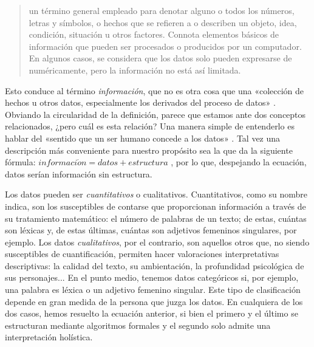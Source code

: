 \blockquote{un término general empleado para denotar alguno o todos los números, letras y símbolos, o hechos que se refieren a o describen un objeto, idea, condición, situación u otros factores. Connota elementos básicos de información que pueden ser procesados o producidos por un computador. En algunos casos, se considera que los datos solo pueden expresarse de numéricamente, pero la información no está así limitada. \parencite[\textit{s.v.} \textit{data}; traducción propia]{bureau1962}}

Esto conduce al término \textit{información}, que no es otra cosa que una «colección de hechos u otros datos, especialmente los derivados del proceso de datos» \parencite[\textit{s.v.} \textit{information}]{bureau1962}. Obviando la circularidad de la definición, parece que estamos ante dos conceptos relacionados, ¿pero cuál es esta relación? Una manera simple de entenderlo es hablar del «sentido que un ser humano concede a los datos»  \parencite[\textit{s.v.} \textit{information}; traducción propia]{government1997}. Tal vez una descripción más conveniente para nuestro propósito sea la que da la siguiente fórmula: $informaci\acute{o}n = datos + estructura$ \parencite[\textit{s.v.} \textit{data}]{bradley2004}, por lo que, despejando la ecuación, datos serían información sin estructura.

Los datos pueden ser \textit{cuantitativos} o cualitativos. Cuantitativos, como su nombre indica, son los susceptibles de contarse que proporcionan información a través de su tratamiento matemático: el número de palabras de un texto; de estas, cuántas son léxicas y, de estas  últimas, cuántas son adjetivos femeninos singulares, por ejemplo. Los datos \textit{cualitativos}, por el contrario, son aquellos otros que, no siendo susceptibles de cuantificación, permiten hacer valoraciones interpretativas descriptivas: la calidad del texto, su ambientación, la profundidad psicológica de sus personajes... En el punto medio, tenemos datos categóricos si, por ejemplo, una palabra es léxica o un adjetivo femenino singular. Este tipo de clasificación depende en gran medida de la persona que juzga los datos. En cualquiera de los dos casos, hemos resuelto la ecuación anterior, si bien el primero y el último se estructuran mediante algoritmos formales y el segundo solo admite una interpretación holística.

